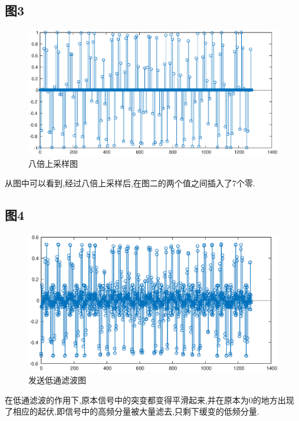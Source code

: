\documentclass[UTF8]{article}
\begin{document}
\begin{CJK}{UTF8}{gkai}
\subsection{图3}
\begin{figure}[H]
    \centering
    \includegraphics[scale=0.7]{plot3.eps}
    \caption{八倍上采样图}
    \label{blocks}
\end{figure}
从图中可以看到,经过八倍上采样后,在图二的两个值之间插入了7个零.
\subsection{图4}
\begin{figure}[H]
    \centering
    \includegraphics[scale=0.7]{plot4.eps}
    \caption{发送低通滤波图}
    \label{blocks}
\end{figure}
在低通滤波的作用下,原本信号中的突变都变得平滑起来,并在原本为0的地方出现了相应的起伏,即信号中的高频分量被大量滤去,只剩下缓变的低频分量.

\end{CJK}
\end{document}
